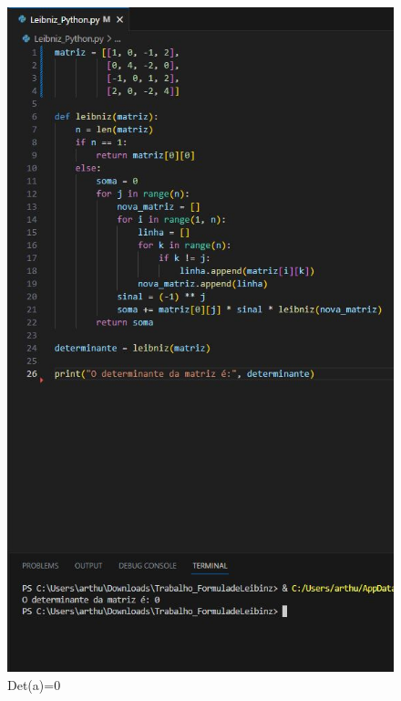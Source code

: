\documentclass{article}
\begin{document}
\begin{figure}
    \centering
    \includegraphics{Matriz0.JPG}
    \caption{Det(a)=0}
    \label{fig:my_label}
\end{figure}
\end{document}
